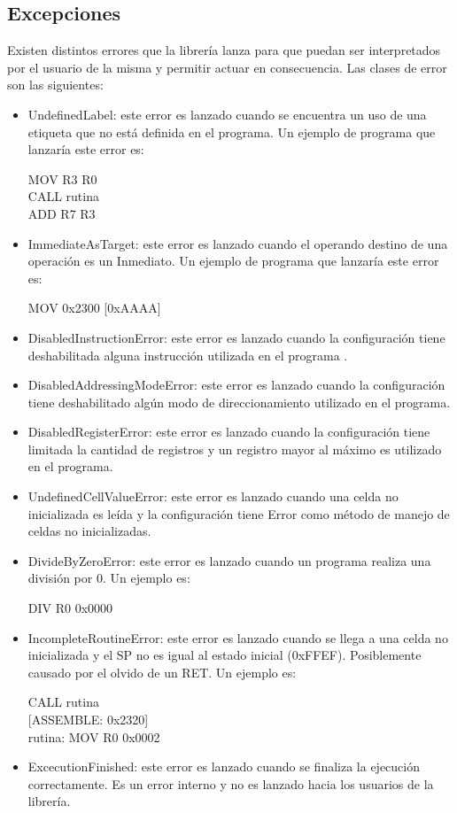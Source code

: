 \subsection{Excepciones}
Existen distintos errores que la librería lanza para que puedan ser interpretados por el usuario de la misma y permitir actuar en consecuencia. 
Las clases de error son las siguientes:

\begin{itemize}
  \item UndefinedLabel: este error es lanzado cuando se encuentra un uso de una etiqueta que no está definida en el programa. Un ejemplo de programa que lanzaría este error es:
  \begin{center}
    MOV R3 R0 \\
    CALL rutina \\
    ADD R7 R3
  \end{center}
  \item ImmediateAsTarget: este error es lanzado cuando el operando destino de una operación es un Inmediato. Un ejemplo de programa que lanzaría este error es:
  \begin{center}
    MOV 0x2300 [0xAAAA]
  \end{center}
  \item DisabledInstructionError: este error es lanzado cuando la configuración tiene deshabilitada alguna instrucción utilizada en el programa .
  \item DisabledAddressingModeError: este error es lanzado cuando la configuración tiene deshabilitado algún modo de direccionamiento utilizado en el programa.
  \item DisabledRegisterError: este error es lanzado cuando la configuración tiene limitada la cantidad de registros y un registro mayor al máximo es utilizado en el programa.
  \item UndefinedCellValueError: este error es lanzado cuando una celda no inicializada es leída y la configuración tiene Error como método de manejo de celdas no inicializadas.
  \item DivideByZeroError: este error es lanzado cuando un programa realiza una división por 0. Un ejemplo es: 
  \begin{center}
    DIV R0 0x0000
  \end{center}
  \item IncompleteRoutineError: este error es lanzado cuando se llega a una celda no inicializada y el SP no es igual al estado inicial (0xFFEF). Posiblemente causado por el olvido de un RET. Un ejemplo es:
  \begin{center}
    CALL rutina \\
    
    [ASSEMBLE: 0x2320] \\
    rutina: MOV R0 0x0002 \\
  \end{center}
  \item ExcecutionFinished: este error es lanzado cuando se finaliza la ejecución correctamente. Es un error interno y no es lanzado hacia los usuarios de la librería.
\end{itemize}



